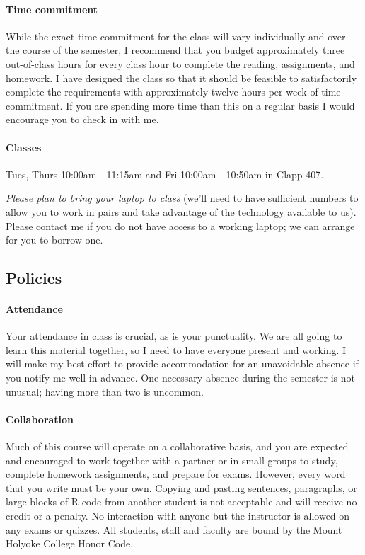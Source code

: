 \documentclass[11pt]{article}
\begin{document}
\paragraph{Time commitment}

While the exact time commitment for the class will vary individually and over the course of the semester, I recommend that you budget approximately three out-of-class hours for every class hour to complete the reading, assignments, and homework.  I have designed the class so that it should be feasible to satisfactorily complete the requirements with approximately twelve hours per week of time commitment.  If you are spending more time than this on a regular basis I would encourage you to check in with me.

\paragraph{Classes} \mbox{}

Tues, Thurs 10:00am - 11:15am and Fri 10:00am - 10:50am in Clapp 407.

\emph{Please plan to bring your laptop to class} (we'll need to have sufficient numbers to allow you to work in pairs and take advantage of the technology available to us).  Please contact me if you do not have access to a working laptop; we can arrange for you to borrow one.

\subsection*{Policies}

\paragraph{Attendance}
Your attendance in class is crucial, as is your punctuality. We are all going to learn this material together, so I need to have everyone present and working. I will make my best effort to provide accommodation for an unavoidable absence if you notify me well in advance. 
One necessary absence during the semester is not unusual; having more than two is uncommon.

\paragraph{Collaboration}
Much of this course will operate on a collaborative basis, and you are expected and encouraged to work together with a partner or in small groups to study, complete homework assignments, and prepare for exams. However, every word that you write must be your own. Copying and pasting sentences, paragraphs, or large blocks of R code from another student is not acceptable and will receive no credit or a penalty. No interaction with 
anyone but the instructor is allowed on any exams or quizzes.  All students, staff and faculty are bound by the Mount Holyoke College Honor Code.
\end{document}

